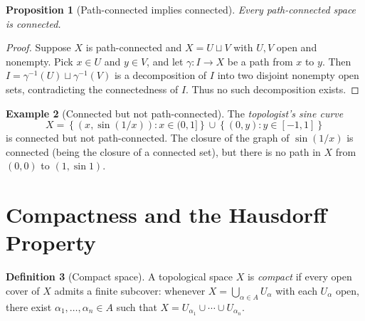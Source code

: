 \documentclass[12pt,a4paper,openany]{book}
\theoremstyle{definition}
\newtheorem{definition}{Definition}[chapter]
\newtheorem{example}[definition]{Example}
\theoremstyle{plain}
\newtheorem{proposition}[definition]{Proposition}
\theoremstyle{remark}
\newcommand{\set}[1]{\left\{#1\right\}}
\begin{document}
\begin{proposition}[Path-connected implies connected]\label{prop:path-connected-implies-connected}
Every path-connected space is connected.
\end{proposition}

\begin{proof}
Suppose $X$ is path-connected and $X = U \sqcup V$ with $U, V$ open and
nonempty. Pick $x \in U$ and $y \in V$, and let $\gamma \colon I \to X$ be a
path from $x$ to $y$. Then $I = \gamma^{-1}(U) \sqcup \gamma^{-1}(V)$ is a
decomposition of $I$ into two disjoint nonempty open sets, contradicting the
connectedness of $I$. Thus no such decomposition exists.
\end{proof}

\begin{example}[Connected but not path-connected]\label{ex:topologist-sine}
The \emph{topologist's sine curve}
\[
  X = \set{(x, \sin(1/x)) : x \in (0,1]} \cup \set{(0,y) : y \in [-1,1]}
\]
is connected but not path-connected. The closure of the graph of $\sin(1/x)$ is
connected (being the closure of a connected set), but there is no path in $X$
from $(0,0)$ to $(1, \sin 1)$.
\end{example}

\begin{center}
\label{fig:topologist-sine}
\end{center}


\section{Compactness and the Hausdorff Property}\label{sec:compact-hausdorff}

\begin{definition}[Compact space]\label{def:compact}
A topological space $X$ is \emph{compact} if every open
cover of $X$ admits a finite subcover: whenever $X = \bigcup_{\alpha \in A}
U_\alpha$ with each $U_\alpha$ open, there exist $\alpha_1, \ldots, \alpha_n
\in A$ such that $X = U_{\alpha_1} \cup \cdots \cup U_{\alpha_n}$.
\end{definition}
\end{document}
